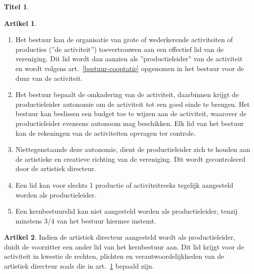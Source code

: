 \documentclass[a4paper,10pt]{article}
\theoremstyle{definition}
\newtheorem{titel}{\newline\Large Titel}
\newtheorem{artikel}{\large Artikel}
\newcommand{\ttextcr}{\hfill\newline}
\newcommand{\ttextenum}{\mbox{}}
\begin{document}
\begin{titel}
  \begin{artikel}\label{bestuur-productie}\ttextenum
    \begin{enumerate}
      \item
        Het bestuur kan de organisatie van grote of wederkerende activiteiten of producties (''de activiteit'') toevertrouwen aan een effectief lid van de vereniging.
        Dit lid wordt dan aanzien als ''productieleider'' van de activiteit en wordt volgens art.~\ref{bestuur-cooptatie} opgenomen in het bestuur voor de duur van de activiteit.
      \item
        Het bestuur bepaalt de omkadering van de activiteit, daarbinnen krijgt de productieleider autonomie om de activiteit tot een goed einde te brengen.
        Het bestuur kan beslissen een budget toe te wijzen aan de activiteit, waarover de productieleider eveneens autonoom mag beschikken.
        Elk lid van het bestuur kan de rekeningen van de activiteiten opvragen ter controle.
      \item
        Niettegenstaande deze autonomie, dient de productieleider zich te houden aan de artistieke en creatieve richting van de vereniging.
        Dit wordt gecontroleerd door de artistiek directeur.
      \item
        Een lid kan voor slechts 1 productie of activiteitreeks tegelijk aangesteld worden als productieleider.
      \item
        Een kernbestuurslid kan niet aangesteld worden als productieleider, tenzij minstens 3/4 van het bestuur hiermee instemt.
    \end{enumerate}
  \end{artikel}

  \begin{artikel}\ttextcr
    Indien de artistiek directeur aangesteld wordt als productieleider, duidt de voorzitter een ander lid van het kernbestuur aan.
    Dit lid krijgt voor de activiteit in kwestie de rechten, plichten en verantwoordelijkheden van de artistiek directeur zoals die in art.~\ref{bestuur-productie} bepaald zijn.%
  \end{artikel}
    
\end{titel}

\end{document}
